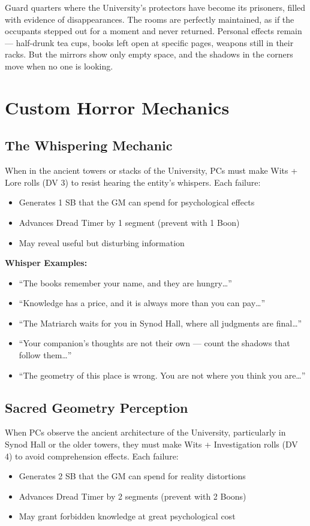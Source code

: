 \documentclass[11pt]{article}
\begin{document}
Guard quarters where the University's protectors have become its prisoners, filled with evidence of disappearances. The rooms are perfectly maintained, as if the occupants stepped out for a moment and never returned. Personal effects remain --- half-drunk tea cups, books left open at specific pages, weapons still in their racks. But the mirrors show only empty space, and the shadows in the corners move when no one is looking.

\section{Custom Horror Mechanics}

\subsection{The Whispering Mechanic}

When in the ancient towers or stacks of the University, PCs must make Wits + Lore rolls (DV 3) to resist hearing the entity's whispers. Each failure:
\begin{itemize}
\item Generates 1 SB that the GM can spend for psychological effects
\item Advances Dread Timer by 1 segment (prevent with 1 Boon)
\item May reveal useful but disturbing information
\end{itemize}

\textbf{Whisper Examples:}
\begin{itemize}
\item ``The books remember your name, and they are hungry\dots''
\item ``Knowledge has a price, and it is always more than you can pay\dots''
\item ``The Matriarch waits for you in Synod Hall, where all judgments are final\dots''
\item ``Your companion's thoughts are not their own --- count the shadows that follow them\dots''
\item ``The geometry of this place is wrong. You are not where you think you are\dots''
\end{itemize}

\subsection{Sacred Geometry Perception}

When PCs observe the ancient architecture of the University, particularly in Synod Hall or the older towers, they must make Wits + Investigation rolls (DV 4) to avoid comprehension effects. Each failure:
\begin{itemize}
\item Generates 2 SB that the GM can spend for reality distortions
\item Advances Dread Timer by 2 segments (prevent with 2 Boons)
\item May grant forbidden knowledge at great psychological cost
\end{itemize}
\end{document}
